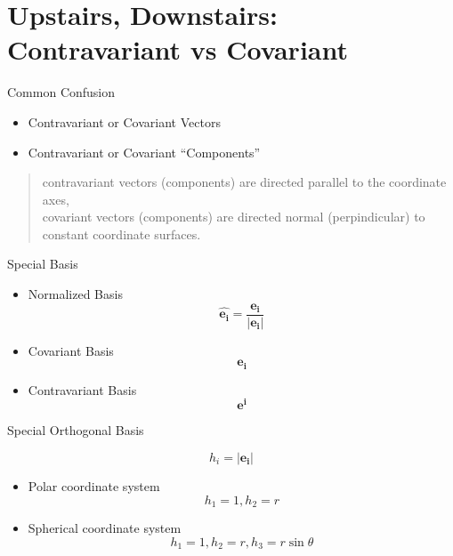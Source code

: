 \documentclass{beamer}
\begin{document}
\section{Upstairs, Downstairs: Contravariant vs Covariant}
\begin{frame}{Common Confusion}
	\pause
	\begin{itemize}
		\item
			Contravariant or Covariant Vectors
		\item
			Contravariant or Covariant \alert{``Components''}
	\end{itemize}
	\pause
	\begin{quote}
		contravariant vectors (components) are directed \alert{parallel} to the coordinate axes, \\
		covariant vectors (components) are directed \alert{normal} (perpindicular) to constant coordinate surfaces.
	\end{quote}
\end{frame}

\begin{frame}{Special Basis}
	\pause
	\begin{itemize}
		\item
			Normalized Basis
			\[ \hat{\mathbf{e_i}} = \frac{\mathbf{e_i}}{|\mathbf{e_i}|} \]
		\item
			Covariant Basis
			\[ \mathbf{e_i} \]
		\item
			Contravariant Basis
			\[ \mathbf{e^i} \]
	\end{itemize}
\end{frame}

\begin{frame}{Special Orthogonal Basis}
	\begin{definition}
		\[ h_i = | \mathbf{e_i} | \]
	\end{definition}
	\pause
	\begin{example}
		\begin{itemize}
			\item
				Polar coordinate system
				\[ h_1 = 1, h_2 = r \]
				\pause
			\item
				Spherical coordinate system
				\[ h_1 = 1, h_2 = r, h_3 = r\sin{\theta} \]
		\end{itemize}
	\end{example}
\end{frame}
\end{document}
